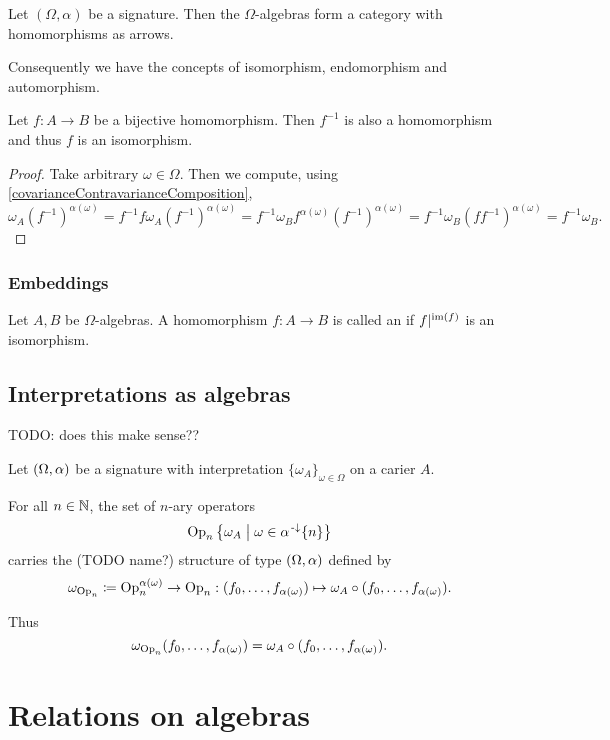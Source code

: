 \begin{proposition}
Let $(\Omega,\alpha)$ be a signature. Then the $\Omega$-algebras form a category with homomorphisms as arrows.
\end{proposition}
Consequently we have the concepts of isomorphism, endomorphism and automorphism.

\begin{proposition} \label{bijectiveHomomorphism}
Let $f:A\to B$ be a bijective homomorphism. Then $f^{-1}$ is also a homomorphism and thus $f$ is an isomorphism.
\end{proposition}
\begin{proof}
Take arbitrary $\omega\in\Omega$. Then we compute, using \ref{covarianceContravarianceComposition},
\[ \omega_A (f^{-1})^{\alpha(\omega)} = f^{-1} f\omega_A (f^{-1})^{\alpha(\omega)} = f^{-1}\omega_B f^{\alpha(\omega)} (f^{-1})^{\alpha(\omega)} = f^{-1}\omega_B (f f^{-1})^{\alpha(\omega)} = f^{-1}\omega_B. \]
\end{proof}

\subsubsection{Embeddings}
\begin{definition}
Let $A,B$ be $\Omega$-algebras. A homomorphism $f:A\to B$ is called an  if $f|^{\operatorname{im}(f)}$ is an isomorphism.
\end{definition}

\subsection{Interpretations as algebras}
TODO: does this make sense??
\begin{definition}
Let $\sSet{\Omega, \alpha}$ be a signature with interpretation $\{\omega_A\}_{\omega\in \Omega}$ on a carier $A$.

For all $n\in \mathbb{N}$, the set of $n$-ary operators
\[ \Op_n \setbuilder{\omega_A}{\omega\in \alpha^{\preimf}\{n\}} \]
carries the  (TODO name?) structure of type $\sSet{\Omega, \alpha}$ defined by
\[ \omega_{\operatorname{Op}_n} \coloneqq \operatorname{Op}_n^{\alpha(\omega)}\to \operatorname{Op}_n: (f_0,\ldots, f_{\alpha(\omega)}) \mapsto \omega_A\circ (f_0,\ldots, f_{\alpha(\omega)}). \]
\end{definition}
Thus
\[ \omega_{\operatorname{Op}_n}(f_0,\ldots, f_{\alpha(\omega)}) = \omega_A\circ (f_0,\ldots, f_{\alpha(\omega)}). \]

\section{Relations on algebras}
